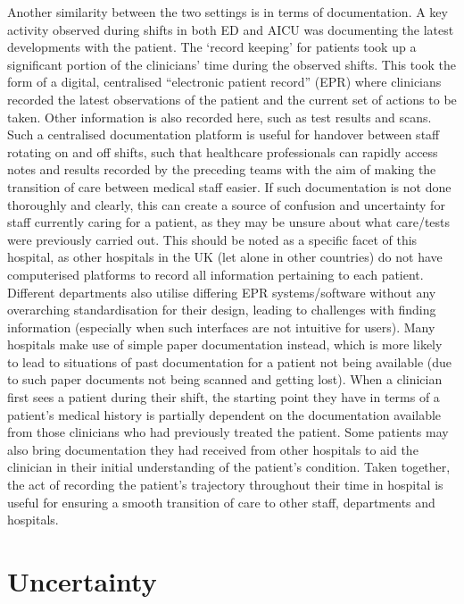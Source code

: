 \documentclass[a4paper, nobind]{templates/ociamthesis}
\begin{document}
\hfill\break
Another similarity between the two settings is in terms of documentation. A key activity observed during shifts in both ED and AICU was documenting the latest developments with the patient. The `record keeping' for patients took up a significant portion of the clinicians' time during the observed shifts. This took the form of a digital, centralised ``electronic patient record'' (EPR) where clinicians recorded the latest observations of the patient and the current set of actions to be taken. Other information is also recorded here, such as test results and scans. Such a centralised documentation platform is useful for handover between staff rotating on and off shifts, such that healthcare professionals can rapidly access notes and results recorded by the preceding teams with the aim of making the transition of care between medical staff easier. If such documentation is not done thoroughly and clearly, this can create a source of confusion and uncertainty for staff currently caring for a patient, as they may be unsure about what care/tests were previously carried out. This should be noted as a specific facet of this hospital, as other hospitals in the UK (let alone in other countries) do not have computerised platforms to record all information pertaining to each patient. Different departments also utilise differing EPR systems/software without any overarching standardisation for their design, leading to challenges with finding information (especially when such interfaces are not intuitive for users). Many hospitals make use of simple paper documentation instead, which is more likely to lead to situations of past documentation for a patient not being available (due to such paper documents not being scanned and getting lost). When a clinician first sees a patient during their shift, the starting point they have in terms of a patient's medical history is partially dependent on the documentation available from those clinicians who had previously treated the patient. Some patients may also bring documentation they had received from other hospitals to aid the clinician in their initial understanding of the patient's condition. Taken together, the act of recording the patient's trajectory throughout their time in hospital is useful for ensuring a smooth transition of care to other staff, departments and hospitals.

\section{Uncertainty}\label{uncertainty}
\end{document}
